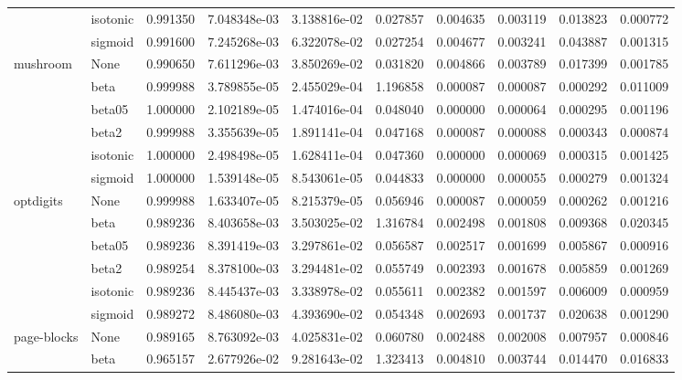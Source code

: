 \begin{tabular}{llrrrrrrrr}
        & isotonic &  0.991350 &  7.048348e-03 &  3.138816e-02 &   0.027857 &  0.004635 &  0.003119 &  0.013823 &  0.000772 \\
        & sigmoid &  0.991600 &  7.245268e-03 &  6.322078e-02 &   0.027254 &  0.004677 &  0.003241 &  0.043887 &  0.001315 \\
mushroom & None &  0.990650 &  7.611296e-03 &  3.850269e-02 &   0.031820 &  0.004866 &  0.003789 &  0.017399 &  0.001785 \\
        & beta &  0.999988 &  3.789855e-05 &  2.455029e-04 &   1.196858 &  0.000087 &  0.000087 &  0.000292 &  0.011009 \\
        & beta05 &  1.000000 &  2.102189e-05 &  1.474016e-04 &   0.048040 &  0.000000 &  0.000064 &  0.000295 &  0.001196 \\
        & beta2 &  0.999988 &  3.355639e-05 &  1.891141e-04 &   0.047168 &  0.000087 &  0.000088 &  0.000343 &  0.000874 \\
        & isotonic &  1.000000 &  2.498498e-05 &  1.628411e-04 &   0.047360 &  0.000000 &  0.000069 &  0.000315 &  0.001425 \\
        & sigmoid &  1.000000 &  1.539148e-05 &  8.543061e-05 &   0.044833 &  0.000000 &  0.000055 &  0.000279 &  0.001324 \\
optdigits & None &  0.999988 &  1.633407e-05 &  8.215379e-05 &   0.056946 &  0.000087 &  0.000059 &  0.000262 &  0.001216 \\
        & beta &  0.989236 &  8.403658e-03 &  3.503025e-02 &   1.316784 &  0.002498 &  0.001808 &  0.009368 &  0.020345 \\
        & beta05 &  0.989236 &  8.391419e-03 &  3.297861e-02 &   0.056587 &  0.002517 &  0.001699 &  0.005867 &  0.000916 \\
        & beta2 &  0.989254 &  8.378100e-03 &  3.294481e-02 &   0.055749 &  0.002393 &  0.001678 &  0.005859 &  0.001269 \\
        & isotonic &  0.989236 &  8.445437e-03 &  3.338978e-02 &   0.055611 &  0.002382 &  0.001597 &  0.006009 &  0.000959 \\
        & sigmoid &  0.989272 &  8.486080e-03 &  4.393690e-02 &   0.054348 &  0.002693 &  0.001737 &  0.020638 &  0.001290 \\
page-blocks & None &  0.989165 &  8.763092e-03 &  4.025831e-02 &   0.060780 &  0.002488 &  0.002008 &  0.007957 &  0.000846 \\
        & beta &  0.965157 &  2.677926e-02 &  9.281643e-02 &   1.323413 &  0.004810 &  0.003744 &  0.014470 &  0.016833 \\

\end{tabular}
